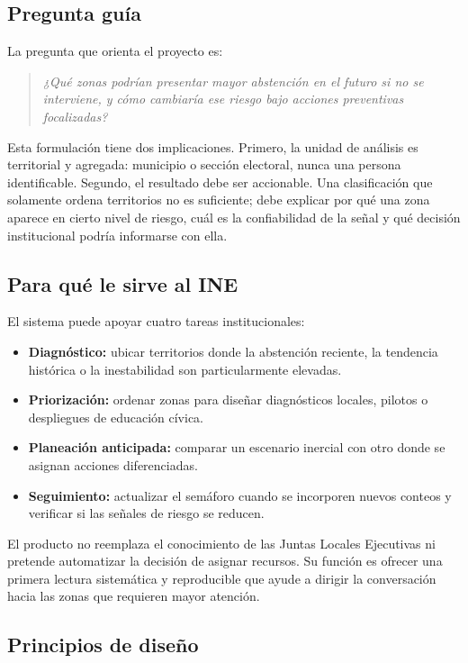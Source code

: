 \documentclass[11pt,a4paper]{article}
\begin{document}
\subsection{Pregunta guía}

La pregunta que orienta el proyecto es:

\begin{quote}
\emph{¿Qué zonas podrían presentar mayor abstención en el futuro si no se interviene, y cómo cambiaría ese riesgo bajo acciones preventivas focalizadas?}
\end{quote}

Esta formulación tiene dos implicaciones. Primero, la unidad de análisis es territorial y agregada: municipio o sección electoral, nunca una persona identificable. Segundo, el resultado debe ser accionable. Una clasificación que solamente ordena territorios no es suficiente; debe explicar por qué una zona aparece en cierto nivel de riesgo, cuál es la confiabilidad de la señal y qué decisión institucional podría informarse con ella.

\subsection{Para qué le sirve al INE}

El sistema puede apoyar cuatro tareas institucionales:
\begin{itemize}
    \item \textbf{Diagnóstico:} ubicar territorios donde la abstención reciente, la tendencia histórica o la inestabilidad son particularmente elevadas.
    \item \textbf{Priorización:} ordenar zonas para diseñar diagnósticos locales, pilotos o despliegues de educación cívica.
    \item \textbf{Planeación anticipada:} comparar un escenario inercial con otro donde se asignan acciones diferenciadas.
    \item \textbf{Seguimiento:} actualizar el semáforo cuando se incorporen nuevos conteos y verificar si las señales de riesgo se reducen.
\end{itemize}

El producto no reemplaza el conocimiento de las Juntas Locales Ejecutivas ni pretende automatizar la decisión de asignar recursos. Su función es ofrecer una primera lectura sistemática y reproducible que ayude a dirigir la conversación hacia las zonas que requieren mayor atención.

\subsection{Principios de diseño}
\end{document}
